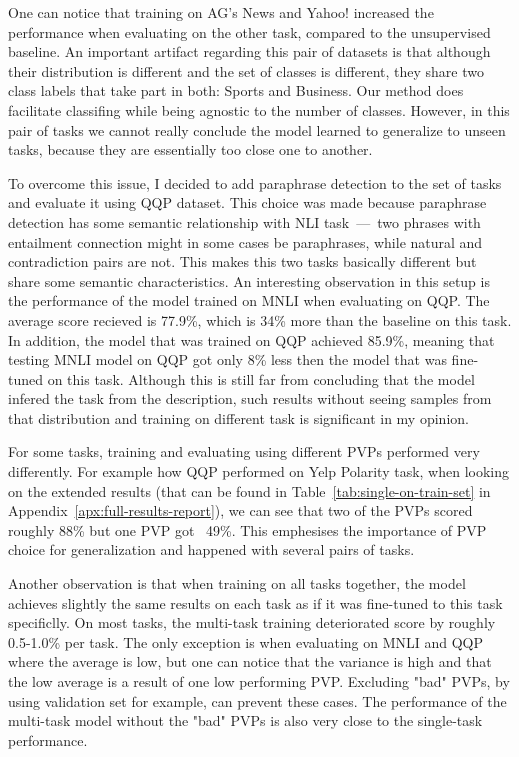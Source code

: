 \documentclass[11pt,a4paper]{article}
\begin{document}
One can notice that training on AG's News and Yahoo! increased the performance when evaluating on the other task, compared to the unsupervised baseline.
An important artifact regarding this pair of datasets is that although their distribution is different and the set of classes is different, they share two class labels that take part in both: Sports and Business.
Our method does facilitate classifing while being agnostic to the number of classes.
However, in this pair of tasks we cannot really conclude the model learned to generalize to unseen tasks, because they are essentially too close one to another.

To overcome this issue, I decided to add paraphrase detection to the set of tasks and evaluate it using QQP dataset.
This choice was made because paraphrase detection has some semantic relationship with NLI task~---~two phrases with entailment connection might in some cases be paraphrases, while natural and contradiction pairs are not.
This makes this two tasks basically different but share some semantic characteristics. 
An interesting observation in this setup is the performance of the model trained on MNLI when evaluating on QQP.
The average score recieved is 77.9\%, which is 34\% more than the baseline on this task.
In addition, the model that was trained on QQP achieved 85.9\%, meaning that testing MNLI model on QQP got only 8\% less then the model that was fine-tuned on this task.
Although this is still far from concluding that the model infered the task from the description, such results without seeing samples from that distribution and training on different task is significant in my opinion.

For some tasks, training and evaluating using different PVPs performed very differently.
For example how QQP performed on Yelp Polarity task, when looking on the extended results (that can be found in Table~\ref{tab:single-on-train-set} in Appendix~\ref{apx:full-results-report}), we can see that two of the PVPs scored roughly 88\% but one PVP got ~49\%.
This emphesises the importance of PVP choice for generalization and happened with several pairs of tasks.

Another observation is that when training on all tasks together, the model achieves slightly the same results on each task as if it was fine-tuned to this task specificlly.
On most tasks, the multi-task training deteriorated score by roughly 0.5-1.0\% per task.
The only exception is when evaluating on MNLI and QQP where the average is low, but one can notice that the variance is high and that the low average is a result of one low performing PVP.
Excluding "bad" PVPs, by using validation set for example, can prevent these cases.
The performance of the multi-task model without the "bad" PVPs is also very close to the single-task performance.
\end{document}
